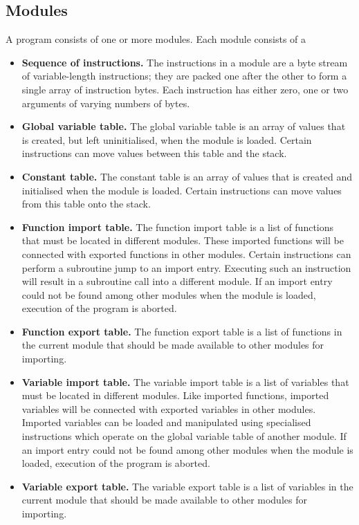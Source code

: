 \subsection{Modules}

A program consists of one or more modules. Each module consists of a

\begin{itemize}
    \item \textbf{Sequence of instructions.} The instructions in a module are a byte stream of variable-length instructions; they are packed one after the other to form a single array of instruction bytes. Each instruction has either zero, one or two arguments of varying numbers of bytes.
    
    \item \textbf{Global variable table.} The global variable table is an array of values that is created, but left uninitialised, when the module is loaded. Certain instructions can move values between this table and the stack.
    
    \item \textbf{Constant table.} The constant table is an array of values that is created and initialised when the module is loaded. Certain instructions can move values from this table onto the stack.
    
    \item \textbf{Function import table.} The function import table is a list of functions that must be located in different modules. These imported functions will be connected with exported functions in other modules. Certain instructions can perform a subroutine jump to an import entry. Executing such an instruction will result in a subroutine call into a different module. If an import entry could not be found among other modules when the module is loaded, execution of the program is aborted.
    
    \item \textbf{Function export table.} The function export table is a list of functions in the current module that should be made available to other modules for importing.
    
    \item \textbf{Variable import table.} The variable import table is a list of variables that must be located in different modules. Like imported functions, imported variables will be connected with exported variables in other modules. Imported variables can be loaded and manipulated using specialised instructions which operate on the global variable table of another module. If an import entry could not be found among other modules when the module is loaded, execution of the program is aborted.
    
    \item \textbf{Variable export table.} The variable export table is a list of variables in the current module that should be made available to other modules for importing.
\end{itemize}

